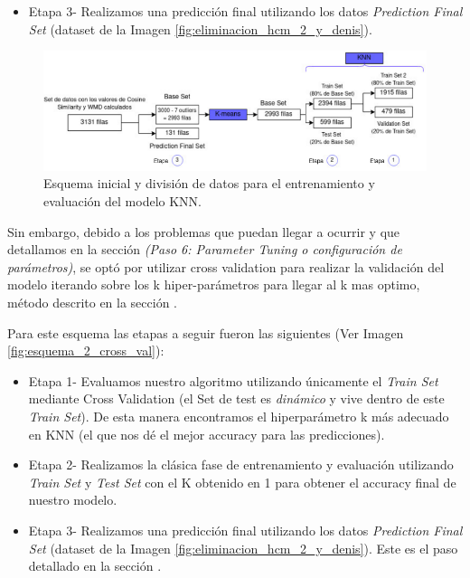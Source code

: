 \documentclass[12pt,a4paper]{article}
\begin{document}
\begin{sloppypar}
\begin{itemize}
\item Etapa 3- Realizamos una predicción final utilizando los datos \textit{Prediction Final Set} (dataset de la Imagen \ref{fig:eliminacion_hcm_2_y_denis}). 
\end{itemize}

\begin{figure}[H]   
\centering
\includegraphics[width=1\textwidth]{images/implementacion_5/esquema_1_validacion.png}
\captionsetup{justification=centering,margin=2cm}
\caption{Esquema inicial y división de datos para el entrenamiento y evaluación del modelo KNN.}
\label{fig:esquema_1_validacion}
\end{figure}

Sin embargo, debido a los problemas que puedan llegar a ocurrir y que detallamos en la sección \textit{ (Paso 6: Parameter Tuning o configuración de parámetros)}, se optó por utilizar cross validation para realizar la validación del modelo iterando sobre los k hiper-parámetros para llegar al k mas optimo, método descrito en la sección \textit{}.

\cleardoublepage

Para este esquema las etapas a seguir fueron las siguientes (Ver Imagen \ref{fig:esquema_2_cross_val}):

\begin{itemize}
\item Etapa 1- Evaluamos nuestro algoritmo utilizando únicamente el \textit{Train Set} mediante Cross Validation (el Set de test es \textit{dinámico} y vive dentro de este \textit{Train Set}). De esta manera encontramos el hiperparámetro k más adecuado en KNN (el que nos dé el mejor accuracy para las predicciones).

\item Etapa 2- Realizamos la clásica fase de entrenamiento y evaluación utilizando \textit{Train Set} y \textit{Test Set} con el K obtenido en 1 para obtener el accuracy final de nuestro modelo. 

\item Etapa 3- Realizamos una predicción final utilizando los datos \textit{Prediction Final Set} (dataset de la Imagen \ref{fig:eliminacion_hcm_2_y_denis}). Este es el paso detallado en la sección \textit{}.


\end{itemize}
\end{sloppypar}
\end{document}
